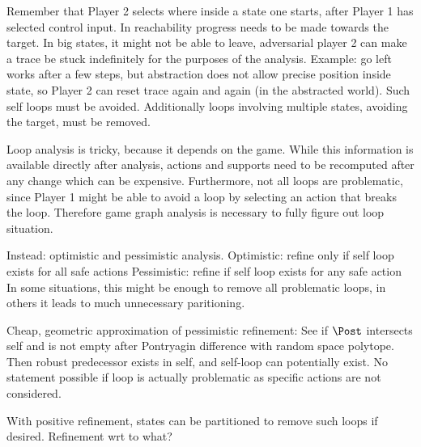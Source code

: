 \startsubsection[title={Loop Removal},reference={sec:refinement-product-loops}]


    Remember that Player 2 selects where inside a state one starts, after Player 1 has selected control input.
    In reachability progress needs to be made towards the target.
    In big states, it might not be able to leave, adversarial player 2 can make a trace be stuck indefinitely for the purposes of the analysis.
    Example: go left works after a few steps, but abstraction does not allow precise position inside state, so Player 2 can reset trace again and again (in the abstracted world).
    Such self loops must be avoided.
    Additionally loops involving multiple states, avoiding the target, must be removed.

    Loop analysis is tricky, because it depends on the game.
    While this information is available directly after analysis, actions and supports need to be recomputed after any change which can be expensive.
    Furthermore, not all loops are problematic, since Player 1 might be able to avoid a loop by selecting an action that breaks the loop.
    Therefore game graph analysis is necessary to fully figure out loop situation.

    Instead: optimistic and pessimistic analysis.
    Optimistic: refine only if self loop exists for all safe actions
    Pessimistic: refine if self loop exists for any safe action
    In some situations, this might be enough to remove all problematic loops, in others it leads to much unnecessary paritioning.

    Cheap, geometric approximation of pessimistic refinement:
    See if $\Post$ intersects self and is not empty after Pontryagin difference with random space polytope.
    Then robust predecessor exists in self, and self-loop can potentially exist.
    No statement possible if loop is actually problematic as specific actions are not considered.

    With positive refinement, states can be partitioned to remove such loops if desired.
    Refinement wrt to what? %

\stopsubsection

